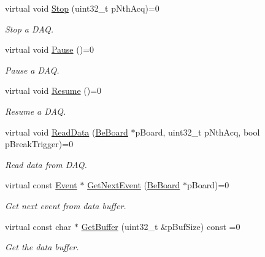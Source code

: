 \begin{CompactItemize}
virtual void \hyperlink{class_ph2___hw_interface_1_1_be_board_f_w_interface_34c0dc403995e843eccbb82dd73f5b51}{Stop} (uint32\_\-t p\-Nth\-Acq)=0
\begin{CompactList}\small\item\em Stop a DAQ. \item\end{CompactList}\item 
virtual void \hyperlink{class_ph2___hw_interface_1_1_be_board_f_w_interface_a943bad9e1dc079d2f4244f749695bd1}{Pause} ()=0
\begin{CompactList}\small\item\em Pause a DAQ. \item\end{CompactList}\item 
virtual void \hyperlink{class_ph2___hw_interface_1_1_be_board_f_w_interface_5d48a64b90e48d8bd897fca48482baf8}{Resume} ()=0
\begin{CompactList}\small\item\em Resume a DAQ. \item\end{CompactList}\item 
virtual void \hyperlink{class_ph2___hw_interface_1_1_be_board_f_w_interface_e5e2d8bc8a89d205067b230ec7d9d098}{Read\-Data} (\hyperlink{class_ph2___hw_description_1_1_be_board}{Be\-Board} $\ast$p\-Board, uint32\_\-t p\-Nth\-Acq, bool p\-Break\-Trigger)=0
\begin{CompactList}\small\item\em Read data from DAQ. \item\end{CompactList}\item 
virtual const \hyperlink{class_ph2___hw_interface_1_1_event}{Event} $\ast$ \hyperlink{class_ph2___hw_interface_1_1_be_board_f_w_interface_b3b8b839abfd2c3a646015f22db5312a}{Get\-Next\-Event} (\hyperlink{class_ph2___hw_description_1_1_be_board}{Be\-Board} $\ast$p\-Board)=0
\begin{CompactList}\small\item\em Get next event from data buffer. \item\end{CompactList}\item 
virtual const char $\ast$ \hyperlink{class_ph2___hw_interface_1_1_be_board_f_w_interface_1a6443a82393e05a60d6d11dd117803a}{Get\-Buffer} (uint32\_\-t \&p\-Buf\-Size) const =0
\begin{CompactList}\small\item\em Get the data buffer. \item\end{CompactList}\end{CompactItemize}

